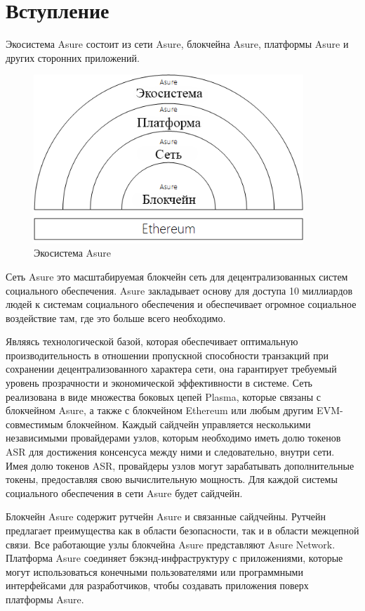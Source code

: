 \section{Вступление}
Экосистема Asure состоит из сети Asure, блокчейна Asure, платформы Asure и других сторонних приложений. 

\begin{figure}[H]
    \centering
    \includegraphics[width=4.0in]{img/ecosystem.png}
    \caption{Экосистема Asure}
    \label{fig:asure_ecosystem}
\end{figure}

Сеть Asure это масштабируемая блокчейн сеть для децентрализованных систем социального обеспечения. Asure закладывает основу для доступа 10 миллиардов людей к системам социального обеспечения и обеспечивает огромное социальное воздействие там, где это больше всего необходимо. \cite{worldometers} 

Являясь технологической базой, которая обеспечивает оптимальную производительность в отношении пропускной способности транзакций при сохранении децентрализованного характера сети, она гарантирует требуемый уровень прозрачности и экономической эффективности в системе. Сеть реализована в виде множества боковых цепей Plasma, которые связаны с блокчейном Asure, а также с блокчейном Ethereum или любым другим EVM-совместимым блокчейном. Каждый сайдчейн управляется несколькими независимыми провайдерами узлов, которым необходимо иметь долю токенов ASR для достижения консенсуса между ними и следовательно, внутри сети. Имея долю токенов ASR, провайдеры узлов могут зарабатывать дополнительные токены, предоставляя свою вычислительную мощность. Для каждой системы социального обеспечения в сети Asure будет сайдчейн.

Блокчейн Asure содержит рутчейн Asure и связанные сайдчейны. Рутчейн предлагает преимущества как в области безопасности, так и в области межцепной связи. Все работающие узлы блокчейна Asure представляют Asure Network. Платформа Asure соединяет бэкэнд-инфраструктуру с приложениями, которые могут использоваться конечными пользователями или программными интерфейсами для разработчиков, чтобы создавать приложения поверх платформы Asure. 


